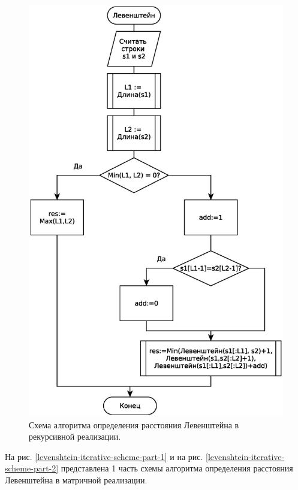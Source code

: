 \begin{figure}
    \centering
    \includegraphics[height=0.75\textheight]{schemes/levenshtein-recursive-eps}
    \caption{Схема алгоритма определения расстояния Левенштейна в рекурсивной реализации.}
    \label{levenshtein-recursive-scheme}
\end{figure}

\FloatBarrier

На рис. \ref{levenshtein-iterative-scheme-part-1} и на рис. \ref{levenshtein-iterative-scheme-part-2} представлена 1 часть схемы алгоритма определения расстояния Левенштейна в матричной реализации.

